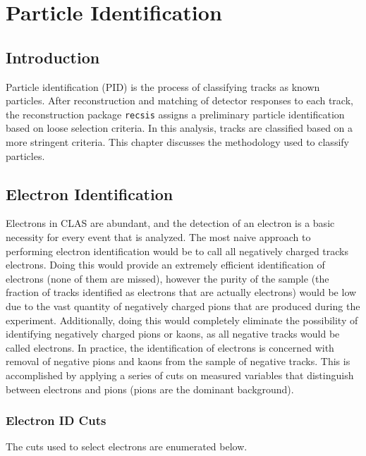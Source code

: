 
\chapter{Particle Identification}

\section{Introduction}
Particle identification (PID) is the process of classifying tracks as known particles.  After reconstruction and matching of detector responses to each track, the reconstruction package \texttt{recsis} assigns a preliminary particle identification based on loose selection criteria.  In this analysis, tracks are classified based on a more stringent criteria.  This chapter discusses the methodology used to classify particles.  

\section{Electron Identification}
Electrons in CLAS are abundant, and the detection of an electron is a basic necessity for every event that is analyzed.  The most naive approach to performing electron identification would be to call all negatively charged tracks electrons.  Doing this would provide an extremely efficient identification of electrons (none of them are missed), however the purity of the sample (the fraction of tracks identified as electrons that are actually electrons) would be low due to the vast quantity of negatively charged pions that are produced during the experiment.  Additionally, doing this would completely eliminate the possibility of identifying negatively charged pions or kaons, as all negative tracks would be called electrons.  In practice, the identification of electrons is concerned with removal of negative pions and kaons from the sample of negative tracks.  This is accomplished by applying a series of cuts on measured variables that distinguish between electrons and pions (pions are the dominant background).

\subsection{Electron ID Cuts}
The cuts used to select electrons are enumerated below.

